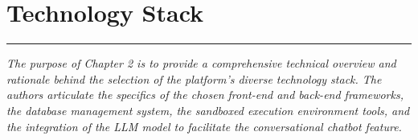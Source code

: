 \chapter {Technology Stack}
\noindent
\rule{\textwidth}{0.4pt}

\begin{center}
\begin{minipage}{0.8\textwidth}
\textit{The purpose of Chapter 2 is to provide a comprehensive technical overview and rationale behind the selection of the platform's diverse technology stack. The authors articulate the specifics of the chosen front-end and back-end frameworks, the database management system, the sandboxed execution environment tools, and the integration of the LLM model to facilitate the conversational chatbot feature.}
\end{minipage}
\end{center}



